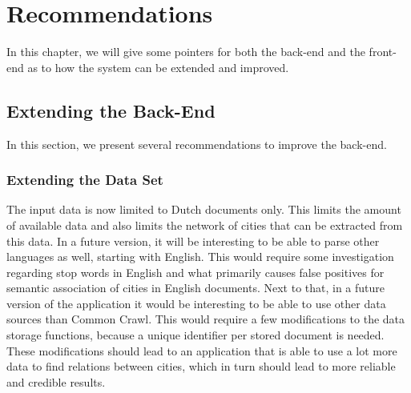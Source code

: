 \chapter{Recommendations}\label{sec:recommendations}
In this chapter, we will give some pointers for both the back-end and the front-end as to how the system can be extended and improved.
 
\section{Extending the Back-End}
In this section, we present several recommendations to improve the back-end.

\subsection{Extending the Data Set}
The input data is now limited to Dutch documents only. This limits the amount of available data and also limits the network of cities that can be extracted from this data. In a future version, it will be interesting to be able to parse other languages as well, starting with English. This would require some investigation regarding stop words in English and what primarily causes false positives for semantic association of cities in English documents. Next to that, in a future version of the application it would be interesting to be able to use other data sources than Common Crawl. This would require a few modifications to the data storage functions, because a unique identifier per stored document is needed. These modifications should lead to an application that is able to use a lot more data to find relations between cities, which in turn should lead to more reliable and credible results.

